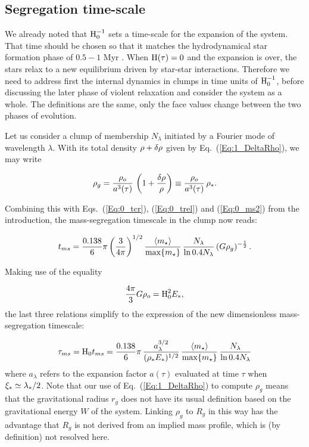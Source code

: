 \subsection{Segregation time-scale} 
\label{Sec:Timescales} 
We already noted that ${\textrm{H}}_0^{-1}$ sets a time-scale for the expansion of the system. That time should be chosen so that it matches the hydrodynamical star formation
phase of $0.5 - 1$ Myr \citep{Maschberger2011,Bate2014}. 
When ${\textrm{H}}(\tau) = 0$ and the expansion is over, the stars relax to a new equilibrium driven by star-star interactions. Therefore we need to address first the 
internal dynamics in clumps in time units of ${\textrm{H}}_0^{-1}$, before discussing the later phase of violent relaxation and consider the system as a whole. 
The definitions are the same, only the face values change between the two phases of evolution. 

Let us consider a clump of membership $N_\lambda$ initiated by a Fourier mode of wavelength $\lambda$. With its total density $\rho + \delta\rho$ given by Eq.~(\ref{Eq:1_DeltaRho}), we may write 

\begin{equation}
 \rho_g = \frac{\rho_o}{a^3(\tau)} \, \left( 1 + \frac{\delta\rho}{\rho} \right) \equiv  \frac{\rho_o}{a^3(\tau)} \, \rho_\ast.
 \end{equation}
 
Combining this with Eqs.~(\ref{Eq:0_tcr}), (\ref{Eq:0_trel}) and (\ref{Eq:0_ms2}) from the introduction, the mass-segregation timescale in the clump now reads:

\begin{equation}
 t_{ms} = \frac{0.138}{6}\pi \left(\frac{3}{4\pi}\right)^{1/2} \frac{\langle m_\star\rangle}{\max\{m_\star\}} \, \frac{N_\lambda}{\ln 0.4 N_\lambda} \, (G\rho_g)^{-\frac{1}{2}}\, . \end{equation}
  
Making use of the equality 

\begin{equation}
\frac{4\pi}{3} G\rho_o = {\textrm{H}}_0^2 E_\ast ,
\end{equation} 
the last three relations simplify to the expression of the new dimensionless mass-segregation timescale:

\begin{equation}\label{Eqn:Taums} 
\tau_{ms} = {\textrm{H}}_0 t_{ms} = \frac{0.138}{6} \pi \, \frac{a_\lambda^{3/2}}{(\rho_\ast E_\ast)^{1/2}} \, \frac{\langle m_\star\rangle}{\max\{m_\star\}} \, \frac{N_\lambda}{\ln 0.4 N_\lambda} 
\end{equation}
where $a_\lambda$ refers to the expansion factor $a(\tau)$ evaluated at time $\tau$ when $\xi_\ast \simeq \lambda_\ast/2$. Note that our use of Eq.~(\ref{Eq:1_DeltaRho}) to compute $\rho_g$ means that the gravitational radius $r_g$ does not have its usual definition based on the gravitational energy $W$ of the system. Linking 
$\rho_g$ to $R_g$ in this way has the advantage that $R_g$ is not derived from an implied mass profile, which is (by definition) not resolved 
here. 

